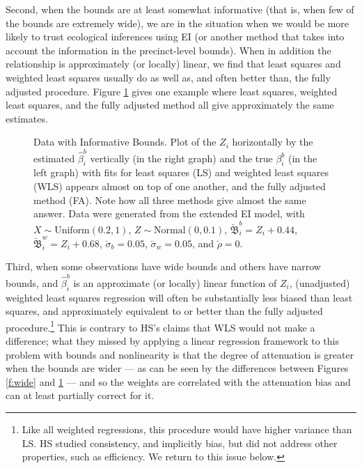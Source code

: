 \documentclass[11pt,titlepage]{article}
\newcommand{\bbeta}{{\mathfrak B}}
\newcommand{\sigmau}{\breve{\sigma}}
\newcommand{\rhou}{\breve{\rho}}
\begin{document}
Second, when the bounds are at least somewhat informative (that is,
when few of the bounds are extremely wide), we are in the situation
when we would be more likely to trust ecological inferences using EI
(or another method that takes into account the information in the
precinct-level bounds).  When in addition the relationship is
approximately (or locally) linear, we find that least squares and
weighted least squares usually do as well as, and often better than,
the fully adjusted procedure.  Figure \ref{f:narrow} gives one example
where least squares, weighted least squares, and the fully adjusted
method all give approximately the same estimates.
\begin{figure}[t]
  \begin{center}
    \caption{Data with Informative Bounds. Plot of the $Z_i$ horizontally by
      the estimated $\hat\beta_i^b$ vertically (in the right graph)
      and the true $\beta_i^b$ (in the left graph) with fits for least
      squares (LS) and weighted least squares (WLS) appears almost on
      top of one another, and the fully adjusted method (FA).  Note
      how all three methods give almost the same answer. Data were
      generated from the extended EI model, with $X \sim
      \textrm{Uniform}(0.2,1)$, $Z \sim \textrm{Normal}(0,0.1)$,
      $\breve\bbeta_i^b = Z_i + 0.44$, $\breve\bbeta_i^w = Z_i +
      0.68$, $\sigmau_b = 0.05$, $\sigmau_w = 0.05$, and $\rhou = 0$.}
    \label{f:narrow}
  \end{center}
\end{figure}

Third, when some observations have wide bounds and others have narrow
bounds, and $\hat\beta_i^b$ is an approximate (or locally) linear
function of $Z_i$, (unadjusted) weighted least squares regression will
often be substantially less biased than least squares, and
approximately equivalent to or better than the fully adjusted
procedure.\footnote{Like all weighted regressions, this procedure
  would have higher variance than LS. HS studied consistency, and
  implicitly bias, but did not address other properties, such as
  efficiency.  We return to this issue below.}  This is contrary to
HS's claims that WLS would not make a difference; what they missed by
applying a linear regression framework to this problem with bounds and
nonlinearity is that the degree of attenuation is greater when the
bounds are wider --- as can be seen by the differences between Figures
\ref{f:wide} and \ref{f:narrow} --- and so the weights are correlated
with the attenuation bias and can at least partially correct for it.
\end{document}

